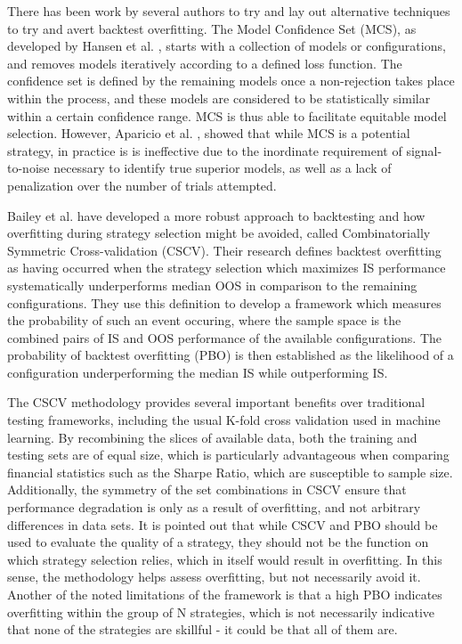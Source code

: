 \documentclass[a4paper,11pt,oneside]{article}
\theoremstyle{plain}
\theoremstyle{definition}
\begin{document}
	There has been work by several authors to try and lay out alternative techniques to try and avert backtest overfitting. 
	The Model Confidence Set (MCS), as developed by Hansen et al. \cite{Hansen}, starts with a 
	collection of models or configurations, and removes models iteratively according to a defined loss function. 
	The confidence set is defined by the remaining models once a non-rejection takes place within the process, and 
	these models are considered to be statistically similar within a certain confidence range. MCS is thus able to facilitate 
	equitable model selection. However, Aparicio et al. \cite{Aparicio}, showed  that while MCS is a potential strategy, in 
	practice is is ineffective due to the inordinate requirement of signal-to-noise necessary to identify true superior 
	models, as well as a lack of penalization over the number of trials attempted.
	\hfill \break
	
	Bailey et al. \cite{BailyPBO} have developed a more robust approach to backtesting and how overfitting during strategy 
	selection might be avoided, called Combinatorially Symmetric Cross-validation (CSCV). Their research defines backtest overfitting as having occurred when the strategy selection which maximizes IS performance systematically underperforms median OOS in comparison to the remaining configurations. They use this definition to develop a framework which measures the probability of such an event occuring, where the sample space is the combined pairs of IS and OOS performance of the available configurations. The probability of backtest overfitting (PBO) is then established as the likelihood of a configuration underperforming the median IS while outperforming IS. 
	\hfill \break 
	
	The CSCV methodology provides several important benefits over traditional testing 
	frameworks, including the usual K-fold cross validation used in machine learning. By recombining the slices of 
	available data, both the training and testing sets are of equal size, which is particularly advantageous when comparing 
	financial statistics such as the Sharpe Ratio, which are susceptible to sample size. Additionally, the symmetry 
	of the set combinations in CSCV ensure that performance degradation is only as a result of overfitting, and not 
	arbitrary differences in data sets. It is pointed out that while CSCV and PBO should be used to evaluate the quality 
	of a strategy, they should not be the function on which strategy selection relies, which in itself would result in overfitting. In this sense, the methodology helps assess overfitting, but not necessarily avoid it. Another of the noted limitations of the framework is 
	that a high PBO indicates overfitting within the group of N strategies, which is not necessarily indicative that none 
	of the strategies are skillful - it could be that all of them are. 
	\hfill \break 
	
\end{document}
